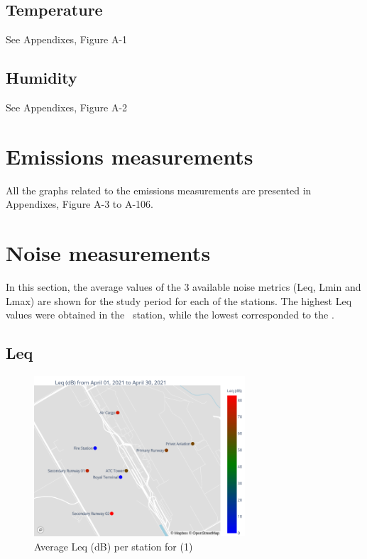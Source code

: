 \documentclass[12pt, oneside]{book}
\begin{document}
\section{Temperature}

See Appendixes, Figure A-1

\section{Humidity}
 
See Appendixes, Figure A-2

\chapter{Emissions measurements}

All the graphs related to the emissions measurements are presented in Appendixes, Figure A-3 to A-106. 

\chapter{Noise measurements}

In this section, the average values of the 3 available noise metrics (Leq, Lmin and Lmax) are shown for the study period for each of the stations. The highest Leq values were obtained in the \maxNoise\ station, while the lowest corresponded to the \minNoise.

\section{Leq}

{\begin{figure}[H]
\centering
\qquad\includegraphics[width=0.7\textwidth, keepaspectratio]{image1}
\caption{Average Leq (dB) per station for \monthyear (1)}\label{image1}
\end{figure}}{}
\end{document}
